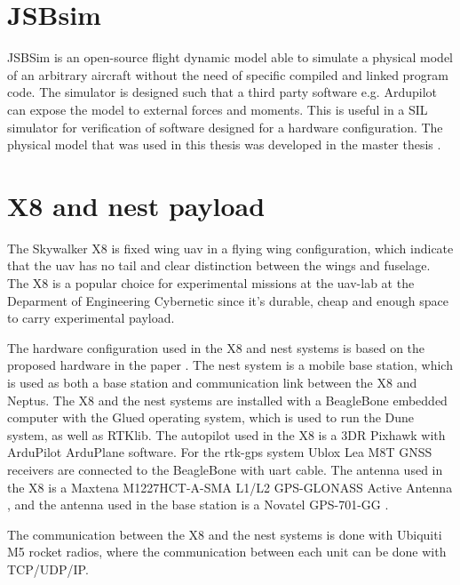 \section{JSBsim}
JSBSim \citep{berndt2004jsbsim} is an open-source flight dynamic model able to simulate a physical model of an arbitrary aircraft without the need of specific compiled and linked program code. The simulator is designed such that a third party software e.g. Ardupilot can expose the model to external forces and moments. This is useful in a SIL simulator for verification of software designed for a hardware configuration. The physical model that was used in this thesis was developed in the master thesis \citep{Gryte}.
\section{X8 and nest payload}\label{ss:X8andNest}
The Skywalker X8 is fixed wing \gls{uav} in a flying wing configuration, which indicate that the \gls{uav} has no tail and clear distinction between the wings and fuselage. The X8 is a popular choice for experimental missions at the \gls{uav}-lab at the Deparment of Engineering Cybernetic since it's durable, cheap and enough space to carry experimental payload.

The hardware configuration used in the X8 and nest systems is based on the proposed hardware in the paper \citep{zolich2015unmanned}. The nest system is a mobile base station, which is used as both a base station and communication link between the X8 and Neptus. The X8 and the nest systems are installed with a BeagleBone embedded computer with the Glued operating system, which is used to run the Dune system, as well as RTKlib. The autopilot used in the X8 is a 3DR Pixhawk with ArduPilot ArduPlane software. For the \gls{rtk-gps} system Ublox Lea M8T GNSS receivers \citep{UbloxDataSheet,UbloxReceiverDescription} are connected to the BeagleBone with uart cable. The antenna used in the X8 is a Maxtena M1227HCT-A-SMA L1/L2 GPS-GLONASS Active Antenna \citep{maxtena}, and the antenna used in the base station is a Novatel GPS-701-GG \citep{novatel}.

The communication between the X8 and the nest systems is done with Ubiquiti M5 rocket \citep{rocketM5} radios, where the communication between each unit can be done with TCP/UDP/IP.
\cleardoublepage